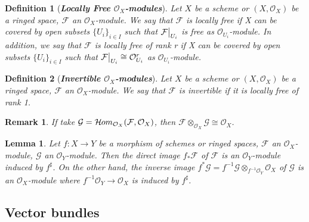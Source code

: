\documentclass{ctexart}
\newtheorem{definition}{Definition}[section]
\newtheorem{remark}{Remark}[section]
\newtheorem{lemma}{Lemma}[section]
\newcommand{\sheafhom}{\mathcal{H}\kern -.5pt om}
\begin{document}
\begin{definition}[\textbf{\emph{Locally Free $\mathcal{O}_{X}$-modules}}]
    Let $X$ be a scheme or $(X, \mathcal{O}_{X})$ be a ringed space, $\mathcal{F}$ an $\mathcal{O}_{X}$-module.
    We say that $\mathcal{F}$ is locally free if X can be covered by open subsets $\{U_{i}\}_{i\in I}$ such that $\mathcal{F}\big{|}_{U_{i}}$ is free as $\mathcal{O}_{U_{i}}$-module.
    In addition, we say that $\mathcal{F}$ is locally free of rank r if X can be covered by open subsets $\{U_{i}\}_{i\in I}$ such that $\mathcal{F}\big{|}_{U_{i}} \cong \mathcal{O}_{U_{i}}^{r}$ as $\mathcal{O}_{U_{i}}$-module.
\end{definition}
\begin{definition}[\textbf{\emph{Invertible $\mathcal{O}_{X}$-modules}}]
    Let $X$ be a scheme or $(X, \mathcal{O}_{X})$ be a ringed space, $\mathcal{F}$ an $\mathcal{O}_{X}$-module.
    We say that $\mathcal{F}$ is invertible if it is locally free of rank 1.
\end{definition}
\begin{remark}
    If take $\mathcal{G} = \sheafhom_{\mathcal{O}_{X}}(\mathcal{F}, \mathcal{O}_{X})$, then $\mathcal{F} \otimes_{\mathcal{O}_{X}} \mathcal{G} \cong \mathcal{O}_{X}$.
\end{remark}
\begin{lemma}
    Let $f: X \longrightarrow Y$ be a morphism of schemes or ringed spaces, $\mathcal{F}$ an $\mathcal{O}_{X}$-module, $\mathcal{G}$ an $\mathcal{O}_{Y}$-module.
    Then the direct image $f_{\ast}\mathcal{F}$ of $\mathcal{F}$ is an $\mathcal{O}_{Y}$-module induced by $f^{\sharp}$.
    On the other hand, the inverse image $f^{\ast}\mathcal{G} = f^{-1}\mathcal{G} \otimes_{f^{-1}\mathcal{O}_{Y}} \mathcal{O}_{X}$ of $\mathcal{G}$ is an $\mathcal{O}_{X}$-module where $f^{-1}\mathcal{O}_{Y} \longrightarrow \mathcal{O}_{X}$ is induced by $f^{\sharp}$.
    \label{Lemma 1.1}
\end{lemma}

\subsection{Vector bundles}
\label{subsection:Vector_Bundles_Vector_bundles}
\end{document}

